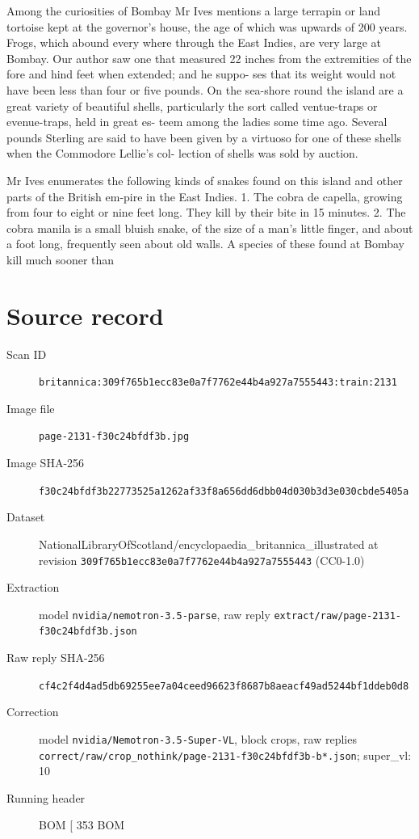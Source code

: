 \documentclass{article}
\begin{document}
Among the curiosities of Bombay Mr Ives mentions
a large terrapin or land tortoise kept at the governor's
house, the age of which was upwards of 200 years.
Frogs, which abound every where through the East
Indies, are very large at Bombay. Our author saw
one that measured 22 inches from the extremities of
the fore and hind feet when extended; and he suppo-
ses that its weight would not have been less than four
or five pounds. On the sea-shore round the island are
a great variety of beautiful shells, particularly the sort
called ventue-traps or evenue-traps, held in great es-
teem among the ladies some time ago. Several pounds
Sterling are said to have been given by a virtuoso for
one of these shells when the Commodore Lellie's col-
lection of shells was sold by auction.

Mr Ives enumerates the following kinds of snakes found on this island and other parts of the British em-pire in the East Indies. 1. The cobra de capella, growing from four to eight or nine feet long. They kill by their bite in 15 minutes. 2. The cobra manila is a small bluish snake, of the size of a man's little finger, and about a foot long, frequently seen about old walls. A species of these found at Bombay kill much sooner than


\section*{Source record}
\begin{description}
\item[Scan ID] \texttt{britannica:309f765b1ecc83e0a7f7762e44b4a927a7555443:train:2131}
\item[Image file] \texttt{page-2131-f30c24bfdf3b.jpg}
\item[Image SHA-256] \texttt{f30c24bfdf3b22773525a1262af33f8a656dd6dbb04d030b3d3e030cbde5405a}
\item[Dataset] NationalLibraryOfScotland/encyclopaedia\_britannica\_illustrated at revision \texttt{309f765b1ecc83e0a7f7762e44b4a927a7555443} (CC0-1.0)
\item[Extraction] model \texttt{nvidia/nemotron-3.5-parse}, raw reply \texttt{extract/raw/page-2131-f30c24bfdf3b.json}
\item[Raw reply SHA-256] \texttt{cf4c2f4d4ad5db69255ee7a04ceed96623f8687b8aeacf49ad5244bf1ddeb0d8}
\item[Correction] model \texttt{nvidia/Nemotron-3.5-Super-VL}, block crops, raw replies \texttt{correct/raw/crop\_nothink/page-2131-f30c24bfdf3b-b*.json}; super\_vl: 10
\item[Running header] BOM [ 353 BOM
\end{description}
\end{document}
